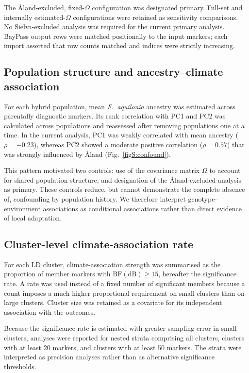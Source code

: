 \documentclass[11pt]{article}
\newcommand{\Faq}{\textit{F.~aquilonia}}
\begin{document}
The \AA{}land-excluded, fixed-\(\Omega\) configuration was designated primary.
Full-set and internally estimated-\(\Omega\) configurations were retained as
sensitivity comparisons. No Sielva-excluded analysis was required for the
current primary analysis. BayPass output rows were matched positionally to the
input markers; each import asserted that row counts matched and indices were
strictly increasing.

\subsection{Population structure and ancestry--climate association}

For each hybrid population, mean \Faq{} ancestry was estimated across
parentally diagnostic markers. Its rank correlation with PC1 and PC2 was
calculated across populations and reassessed after removing populations one at
a time. In the current analysis, PC1 was weakly correlated with mean ancestry
(\(\rho=-0.23\)), whereas PC2 showed a moderate positive correlation
(\(\rho=0.57\)) that was strongly influenced by \AA{}land
(Fig.~\ref{figS:confound}).

This pattern motivated two controls: use of the covariance matrix \(\Omega\) to
account for shared population structure, and designation of the \AA{}land-excluded
analysis as primary. These controls reduce, but cannot demonstrate the complete
absence of, confounding by population history. We therefore interpret
genotype--environment associations as conditional associations rather than
direct evidence of local adaptation.

\subsection{Cluster-level climate-association rate}

For each LD cluster, climate-association strength was summarised as the
proportion of member markers with \(\mathrm{BF(dB)}\geq15\), hereafter the
significance rate. A rate was used instead of a fixed number of significant
members because a count imposes a much higher proportional requirement on
small clusters than on large clusters. Cluster size was retained as a covariate
for its independent association with the outcomes.

Because the significance rate is estimated with greater sampling error in
small clusters, analyses were reported for nested strata comprising all
clusters, clusters with at least 20 markers, and clusters with at least 50
markers. The strata were interpreted as precision analyses rather than as
alternative significance thresholds.
\end{document}
